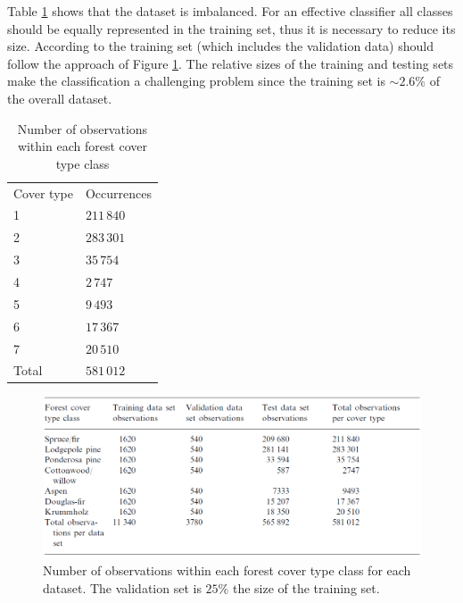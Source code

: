 Table \ref{tab:covertypes} shows that the dataset is imbalanced. For an effective classifier all classes should be equally represented in the training set, thus it is necessary to reduce its size. According to \cite{blackardDean} the training set (which includes the validation data) should follow the approach of Figure \ref{fig:covertypesdims}. The relative sizes of the training and testing sets make the classification a challenging problem since the training set is $\sim2.6\%$ of the overall dataset.
\begin{table}
	\centering
	\begin{tabular}{ll}
		Cover type & Occurrences \\
		1          & $211\,840$  \\
		2          & $283\,301$  \\
		3          & $35\,754$   \\
		4          & $2\,747$    \\
		5          & $9\,493$    \\
		6          & $17\,367$   \\
		7          & $20\,510$   \\
		Total      & $581\,012$     
	\end{tabular}
	\caption{Number of observations within each forest cover type class}
	\label{tab:covertypes}
\end{table}
\begin{figure}
	\centering
	\includegraphics[width=\textwidth]{./TeX_files/img/covertypetable.png}
	\caption{Number of observations within each forest cover type class for each dataset. The validation set is $25\%$ the size of the training set.}
	\label{fig:covertypesdims}
\end{figure}

